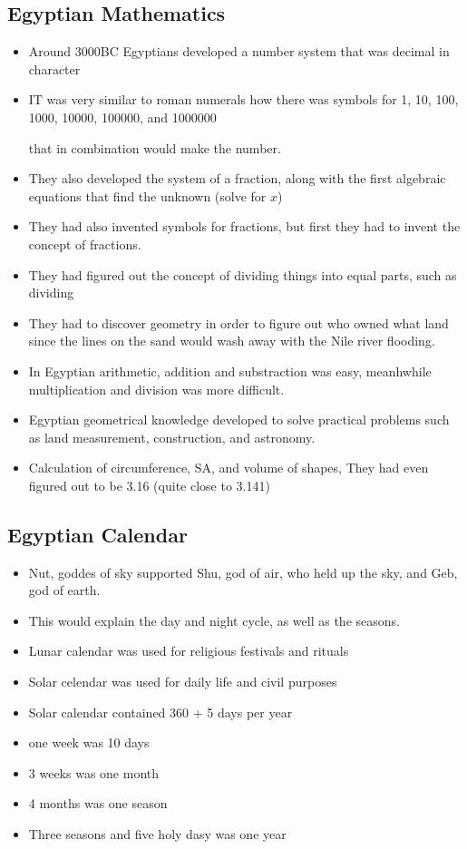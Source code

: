 \documentclass{article}
\begin{document}
\subsection{Egyptian Mathematics}
\begin{itemize}
  \item Around 3000BC Egyptians developed a number system that
    was decimal in character
  \item IT was very similar to roman numerals how there was
    symbols for 1, 10, 100, 1000, 10000, 100000, and 1000000

    that in combination would make the number.
  \item They also developed the system of a fraction,
    along with the first algebraic equations that
    find the unknown (solve for $x$)
  \item They had also invented symbols for fractions,
    but first they had to invent the concept of fractions.
  \item They had figured out the concept of dividing
    things into equal parts, such as dividing
  \item They had to discover geometry in order
    to figure out who owned what land since the lines on the
    sand would wash away with the Nile river flooding.
  \item In Egyptian arithmetic, addition and substraction was easy, meanhwhile
    multiplication and division was more difficult.
  \item Egyptian geometrical knowledge developed to solve practical problems
    such as land measurement, construction, and astronomy.
  \item Calculation of circumference, SA, and volume of shapes,
    They had even figured out \pi{} to be 3.16 (quite close to 3.141)
\end{itemize}

\subsection{Egyptian Calendar}
\begin{itemize}
  \item Nut, goddes of sky supported Shu, god of air,
    who held up the sky, and Geb, god of earth.
  \item This would explain the day and night cycle, as well as the seasons.
  \item Lunar calendar was used for religious festivals and rituals
  \item Solar celendar was used for daily life and civil purposes
  \item Solar calendar contained 360 + 5 days per year
  \item one week was 10 days
  \item 3 weeks was one month
  \item 4 months was one season
  \item Three seasons and five holy dasy was one year
\end{itemize}
\end{document}
